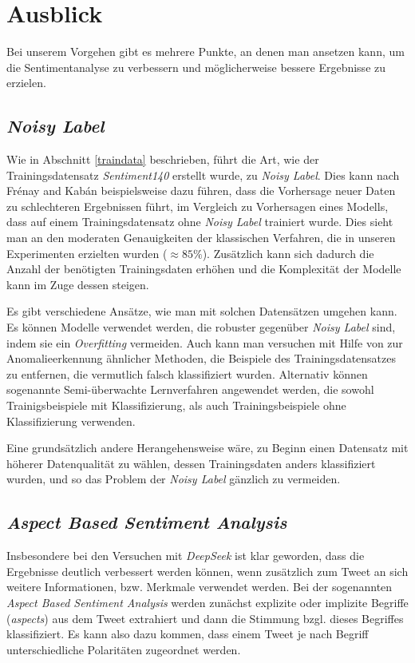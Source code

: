\section{Ausblick}

Bei unserem Vorgehen gibt es mehrere Punkte, an denen man ansetzen kann, um die Sentimentanalyse zu verbessern und möglicherweise bessere Ergebnisse zu erzielen.

\subsection{\textit{Noisy Label}}
Wie in Abschnitt \ref{traindata} beschrieben, führt die Art, wie der Trainingsdatensatz \textit{Sentiment140} erstellt wurde, zu \textit{Noisy Label}.
Dies kann nach Fr{\'e}nay and Kab{\'a}n \cite{NoisyLabel2014} beispielsweise dazu führen, dass die Vorhersage neuer Daten zu schlechteren Ergebnissen führt, im Vergleich zu Vorhersagen eines Modells, dass auf einem Trainingsdatensatz ohne \textit{Noisy Label} trainiert wurde.
Dies sieht man an den moderaten Genauigkeiten der klassischen Verfahren, die in unseren Experimenten erzielten wurden ($\approx{85} \%$).
Zusätzlich kann sich dadurch die Anzahl der benötigten Trainingsdaten erhöhen und die Komplexität der Modelle kann im Zuge dessen steigen.

Es gibt verschiedene Ansätze, wie man mit solchen Datensätzen umgehen kann.
Es können Modelle verwendet werden, die robuster gegenüber \textit{Noisy Label} sind, indem sie ein \textit{Overfitting} vermeiden.
Auch kann man versuchen mit Hilfe von zur Anomalieerkennung ähnlicher Methoden, die Beispiele des Trainingsdatensatzes zu entfernen, die vermutlich falsch klassifiziert wurden.
Alternativ können sogenannte Semi-überwachte Lernverfahren angewendet werden, die sowohl Trainigsbeispiele mit Klassifizierung, als auch Trainingsbeispiele ohne Klassifizierung verwenden.

Eine grundsätzlich andere Herangehensweise wäre, zu Beginn einen Datensatz mit höherer Datenqualität zu wählen, dessen Trainingsdaten anders klassifiziert wurden, und so das Problem der \textit{Noisy Label} gänzlich zu vermeiden.



\subsection{\textit{Aspect Based Sentiment Analysis}}
Insbesondere bei den Versuchen mit \textit{DeepSeek} ist klar geworden, dass die Ergebnisse deutlich verbessert werden können, wenn zusätzlich zum Tweet an sich weitere Informationen, bzw. Merkmale verwendet werden.
Bei der sogenannten \textit{Aspect Based Sentiment Analysis} werden zunächst explizite oder implizite Begriffe (\textit{aspects}) aus dem Tweet extrahiert und dann die Stimmung bzgl. dieses Begriffes klassifiziert.
Es kann also dazu kommen, dass einem Tweet je nach Begriff unterschiedliche Polaritäten zugeordnet werden.

